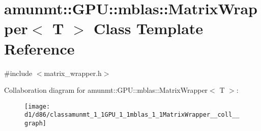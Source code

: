 \hypertarget{classamunmt_1_1GPU_1_1mblas_1_1MatrixWrapper}{}\section{amunmt\+:\+:G\+PU\+:\+:mblas\+:\+:Matrix\+Wrapper$<$ T $>$ Class Template Reference}
\label{classamunmt_1_1GPU_1_1mblas_1_1MatrixWrapper}


{\ttfamily \#include $<$matrix\+\_\+wrapper.\+h$>$}



Collaboration diagram for amunmt\+:\+:G\+PU\+:\+:mblas\+:\+:Matrix\+Wrapper$<$ T $>$\+:
\nopagebreak
\begin{figure}[H]
\begin{center}
\leavevmode
\texttt{[image: d1/d86/classamunmt\_1\_1GPU\_1\_1mblas\_1\_1MatrixWrapper\_\_coll\_\_graph]}
\end{center}
\end{figure}
